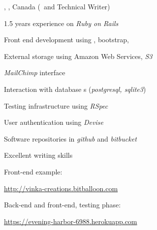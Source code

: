 \textbf{\large \current}

{\jobt{\consultant}, \nameMontreal, Canada (\webdev\ and Technical
Writer)

\begin{list}{} {\leftmargin=-1cm \itemsep-3pt} 
\vspace*{-0.2cm}
\item 1.5 years experience on \textit{Ruby on Rails}
\item Front end development using , bootstrap, 
\item External storage using Amazon Web Services, \textit{S3}
\item \textit{MailChimp} interface
\item Interaction with database s (\textit{postgresql, sqlite3})
\item Testing infrastructure using \textit{RSpec}
\item User authentication using \textit{Devise}
\item Software repositories in \textit{github} and \textit{bitbucket}
\item Excellent writing skills

Front-end example:
   \begin{list}{} {\leftmargin=0.5cm \itemsep-1pt} 
     \vspace*{-0.2cm}
     \item
     \href{http://vinka-creations.bitballoon.com}%
       {\footnotesize{\url{http://vinka-creations.bitballoon.com}}}
   \end{list}
Back-end and front-end, testing phase:
   \begin{list}{} {\leftmargin=0.5cm \itemsep-1pt} 
     \vspace*{-0.2cm}
     \item
     \href{https://evening-harbor-6988.herokuapp.com}%
       {\footnotesize{\url{https://evening-harbor-6988.herokuapp.com}}}
   \end{list}
\end{list}



\iffalse
\vspace*{-0.3cm}
   \begin{list}{\labelitemii} {\leftmargin=0.5cm \itemsep-1pt} 

   \item \webdevA.
     {\footnotesize{\url{https://evening-harbor-6988.herokuapp.com}}}
   \item \webdevB:\\
   \href{http://vinka-creations.bitballoon.com}%
     {\footnotesize{\url{http://vinka-creations.bitballoon.com}}}\\
   \end{list}

\vspace*{-0.2cm}
\item \nameWriter: \writerDesc.
\fi

}
